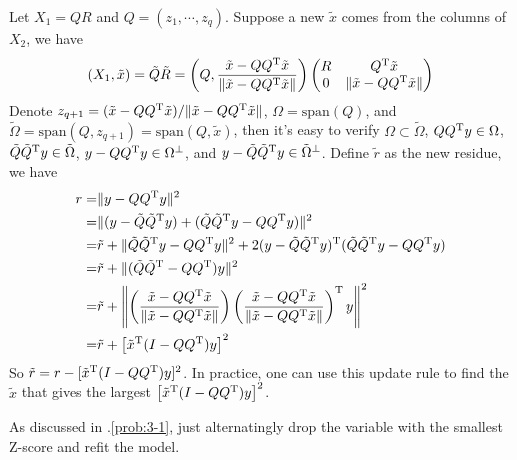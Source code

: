 \begin{sol}
Let $X_1=QR$ and $Q=(z_1,\cdots,z_q)$. Suppose a new $\tilde{x}$ comes from the columns of $X_2$, we have
\[
(X_1, \tilde{x})=\tilde{Q}\tilde{R}=\left(Q,\frac{\tilde{x}-QQ^{\mathrm{T}}\tilde{x}}{\|\tilde{x}-QQ^{\mathrm{T}}\tilde{x}\|}\right)
\begin{pmatrix}
R & Q^{\mathrm{T}}\tilde{x}\\
0 & \|\tilde{x}-QQ^{\mathrm{T}}\tilde{x}\|
\end{pmatrix}
\]
Denote $z_{q+1}=(\tilde{x}-QQ^{\mathrm{T}}\tilde{x})/\|\tilde{x}-QQ^{\mathrm{T}}\tilde{x}\|$, $\Omega=\mathrm{span}(Q)$, and $\tilde{\Omega}=\mathrm{span}(Q,z_{q+1})=\mathrm{span}(Q,\tilde{x})$, then it's easy to verify
$\Omega\subset\tilde{\Omega}$, $QQ^{\mathrm{T}}y\in \Omega$, $\tilde{Q}\tilde{Q}^{\mathrm{T}}y\in \tilde{\Omega}$, $y-QQ^{\mathrm{T}}y\in \Omega^\perp$, and $y-\tilde{Q}\tilde{Q}^{\mathrm{T}}y\in \tilde{\Omega}^\perp$. Define $\tilde{r}$ as the new residue, we have
\begin{align*}
r =& \|y-QQ^{\mathrm{T}}y\|^2\\
=& \|(y-\tilde{Q}\tilde{Q}^{\mathrm{T}}y)+(\tilde{Q}\tilde{Q}^{\mathrm{T}}y-QQ^{\mathrm{T}}y)\|^2\\
=& \tilde{r} + \|\tilde{Q}\tilde{Q}^{\mathrm{T}}y-QQ^{\mathrm{T}}y\|^2 + 2(y-\tilde{Q}\tilde{Q}^{\mathrm{T}}y)^{\mathrm{T}}(\tilde{Q}\tilde{Q}^{\mathrm{T}}y-QQ^{\mathrm{T}}y)\\
=& \tilde{r} + \|(\tilde{Q}\tilde{Q}^{\mathrm{T}}-QQ^{\mathrm{T}})y\|^2\\
=& \tilde{r} + \left\|\left(\frac{\tilde{x}-QQ^{\mathrm{T}}\tilde{x}}{\|\tilde{x}-QQ^{\mathrm{T}}\tilde{x}\|}\right)\left(\frac{\tilde{x}-QQ^{\mathrm{T}}\tilde{x}}{\|\tilde{x}-QQ^{\mathrm{T}}\tilde{x}\|}\right)^{\mathrm{T}}y\right\|^2\\
=& \tilde{r} + \left[\tilde{x}^{\mathrm{T}}(I-QQ^{\mathrm{T}})y\right]^2
\end{align*}
So $\tilde{r}=r-[\tilde{x}^{\mathrm{T}}(I-QQ^{\mathrm{T}})y]^2$. In practice, one can use this update rule to find the $\tilde{x}$ that gives the largest $\left[\tilde{x}^{\mathrm{T}}(I-QQ^{\mathrm{T}})y\right]^2$.
\end{sol}

\begin{sol}
As discussed in \thesection.\ref{prob:3-1}, just alternatingly drop the variable with the smallest Z-score and refit the model.
\end{sol}

